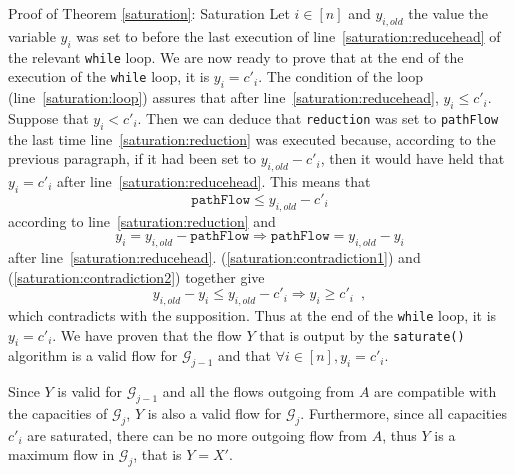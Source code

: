 \begin{sepproof}{Proof of Theorem \ref{saturation}: Saturation}
  Let $i \in [n]$ and $y_{i,old}$ the value the variable $y_i$ was set to before the last execution of
  line~\ref{saturation:reducehead} of the relevant \texttt{while} loop. We are now ready to prove that at the end of the
  execution of the \texttt{while} loop, it is $y_i = c'_i$. The condition of the loop (line~\ref{saturation:loop}) assures
  that after line~\ref{saturation:reducehead}, $y_i \leq c'_i$. Suppose that $y_i < c'_i$. Then we can deduce that
  \texttt{reduction} was set to \texttt{pathFlow} the last time line~\ref{saturation:reduction} was executed because,
  according to the previous paragraph, if it had been set to $y_{i,old} - c'_i$, then it would have held that $y_i = c'_i$
  after line~\ref{saturation:reducehead}. This means that
  \begin{equation}
  \label{saturation:contradiction1}
    \texttt{pathFlow} \leq y_{i,old} - c'_i
  \end{equation}
  according to line~\ref{saturation:reduction} and
  \begin{equation}
  \label{saturation:contradiction2}
    y_i = y_{i,old} - \texttt{pathFlow} \Rightarrow \texttt{pathFlow} = y_{i,old} - y_i
  \end{equation}
  after line~\ref{saturation:reducehead}.
  (\ref{saturation:contradiction1}) and (\ref{saturation:contradiction2}) together give
  \begin{equation*}
    y_{i,old} - y_i \leq y_{i,old} - c'_i \Rightarrow y_i \geq c'_i \enspace,
  \end{equation*}
  which contradicts with the supposition. Thus at the end of the \texttt{while} loop, it is $y_i = c'_i$. We have proven that
  the flow $Y$ that is output by the \texttt{saturate()} algorithm is a valid flow for $\mathcal{G}_{j-1}$ and that $\forall i
  \in [n], y_i =c'_i$.

  Since $Y$ is valid for $\mathcal{G}_{j-1}$ and all the flows outgoing from $A$ are compatible with the capacities of
  $\mathcal{G}_j$, $Y$ is also a valid flow for $\mathcal{G}_j$. Furthermore, since all capacities $c'_i$ are saturated, there
  can be no more outgoing flow from $A$, thus $Y$ is a maximum flow in $\mathcal{G}_j$, that is $Y = X'$.
\end{sepproof}
